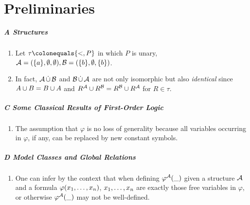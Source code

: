 \chapter{Preliminaries}
\paragraph{A Structures}
\begin{enumerate}[1.]
%
\item {} Let $\tau \defas \sete{{<}, P}$ in which $P$ is unary, $\mathcal{A} = ({\{a\}}, \emptyset, \emptyset), \mathcal{B} = ({\{b\}}, \emptyset, {\{b\}})$.
%
\item {} In fact, $\mathcal{A} \mathop{\dot{\cup}} \mathcal{B}$ and $\mathcal{B} \mathop{\dot{\cup}} \mathcal{A}$ are not only isomorphic but also \emph{identical} since $A \cup B = B \cup A$ and $R^{\mathcal{A}} \cup R^{\mathcal{B}} = R^{\mathcal{B}} \cup R^{\mathcal{A}}$ for $R \in \tau$.
%
\end{enumerate}
\paragraph{C Some Classical Results of First-Order Logic}
\begin{enumerate}[1.]
%
\item {} The assumption that $\varphi$ is no loss of generality because all variables occurring in $\varphi$, if any, can be replaced by new constant symbols.
%
\end{enumerate}
\paragraph{D Model Classes and Global Relations}
\begin{enumerate}[1.]
%
\item {} One can infer by the context that when defining ${\varphi^{\mathcal{A}}(\_)}$ given a structure $\mathcal{A}$ and a formula $\varphi(x_{1}, \ldots, x_{n})$, $x_{1}, \ldots, x_{n}$ are exactly those free variables in $\varphi$, or otherwise ${\varphi^{\mathcal{A}}(\_)}$ may not be well-defined.
%
\end{enumerate}
